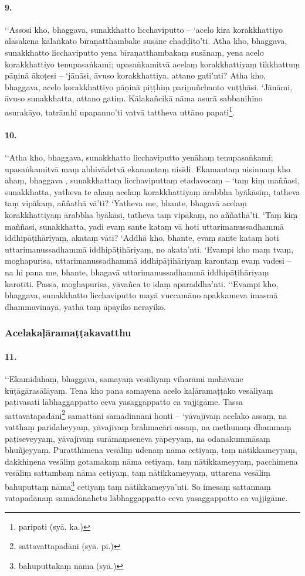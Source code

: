 \paragraph{9.} ‘‘Assosi kho, bhaggava, sunakkhatto licchaviputto – ‘acelo kira korakkhattiyo alasakena kālaṅkato bīraṇatthambake susāne chaḍḍito’ti. Atha kho, bhaggava, sunakkhatto licchaviputto yena bīraṇatthambakaṃ susānaṃ, yena acelo korakkhattiyo tenupasaṅkami; upasaṅkamitvā acelaṃ korakkhattiyaṃ tikkhattuṃ pāṇinā ākoṭesi – ‘jānāsi, āvuso korakkhattiya, attano gati’nti? Atha kho, bhaggava, acelo korakkhattiyo pāṇinā piṭṭhiṃ paripuñchanto vuṭṭhāsi. ‘Jānāmi, āvuso sunakkhatta, attano gatiṃ. Kālakañcikā nāma asurā sabbanihīno asurakāyo, tatrāmhi upapanno’ti vatvā tattheva uttāno papati\footnote{paripati (syā. ka.)}.

\paragraph{10.} ‘‘Atha kho, bhaggava, sunakkhatto licchaviputto yenāhaṃ tenupasaṅkami; upasaṅkamitvā maṃ abhivādetvā ekamantaṃ nisīdi. Ekamantaṃ nisinnaṃ kho ahaṃ, bhaggava , sunakkhattaṃ licchaviputtaṃ etadavocaṃ – ‘taṃ kiṃ maññasi, sunakkhatta, yatheva te ahaṃ acelaṃ korakkhattiyaṃ ārabbha byākāsiṃ, tatheva taṃ vipākaṃ, aññathā vā’ti? ‘Yatheva me, bhante, bhagavā acelaṃ korakkhattiyaṃ ārabbha byākāsi, tatheva taṃ vipākaṃ, no aññathā’ti. ‘Taṃ kiṃ maññasi, sunakkhatta, yadi evaṃ sante kataṃ vā hoti uttarimanussadhammā iddhipāṭihāriyaṃ, akataṃ vāti? ‘Addhā kho, bhante, evaṃ sante kataṃ hoti uttarimanussadhammā iddhipāṭihāriyaṃ, no akata’nti. ‘Evampi kho maṃ tvaṃ, moghapurisa, uttarimanussadhammā iddhipāṭihāriyaṃ karontaṃ evaṃ vadesi – na hi pana me, bhante, bhagavā uttarimanussadhammā iddhipāṭihāriyaṃ karotīti. Passa, moghapurisa, yāvañca te idaṃ aparaddha’nti. ‘‘Evampi kho, bhaggava, sunakkhatto licchaviputto mayā vuccamāno apakkameva imasmā dhammavinayā, yathā taṃ āpāyiko nerayiko.

\subsubsection{Acelakaḷāramaṭṭakavatthu}

\paragraph{11.} ‘‘Ekamidāhaṃ, bhaggava, samayaṃ vesāliyaṃ viharāmi mahāvane kūṭāgārasālāyaṃ. Tena kho pana samayena acelo kaḷāramaṭṭako vesāliyaṃ paṭivasati lābhaggappatto ceva yasaggappatto ca vajjigāme. Tassa sattavatapadāni\footnote{sattavattapadāni (syā. pī.)} samattāni samādinnāni honti – ‘yāvajīvaṃ acelako assaṃ, na vatthaṃ paridaheyyaṃ, yāvajīvaṃ brahmacārī assaṃ, na methunaṃ dhammaṃ paṭiseveyyaṃ, yāvajīvaṃ surāmaṃseneva yāpeyyaṃ, na odanakummāsaṃ bhuñjeyyaṃ. Puratthimena vesāliṃ udenaṃ nāma cetiyaṃ, taṃ nātikkameyyaṃ, dakkhiṇena vesāliṃ gotamakaṃ nāma cetiyaṃ, taṃ nātikkameyyaṃ, pacchimena vesāliṃ sattambaṃ nāma cetiyaṃ, taṃ nātikkameyyaṃ, uttarena vesāliṃ bahuputtaṃ nāma\footnote{bahuputtakaṃ nāma (syā.)} cetiyaṃ taṃ nātikkameyya’nti. So imesaṃ sattannaṃ vatapadānaṃ samādānahetu lābhaggappatto ceva yasaggappatto ca vajjigāme.

